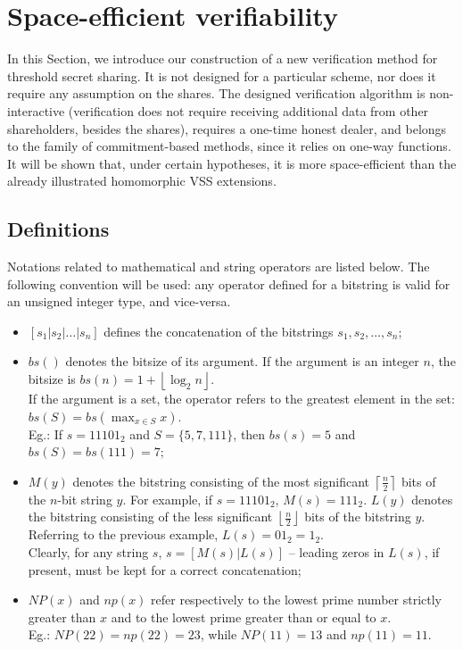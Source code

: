 \documentclass[10pt,journal,cspaper,compsoc]{IEEEtran}
\begin{document}
\section{Space-efficient verifiability}
\label{schemes-section}
In this Section, we introduce our construction of a new verification method for threshold secret sharing. It is not designed for a particular scheme, nor does it require any assumption on the shares.
The designed verification algorithm is non-interactive (verification does not require receiving additional data from other shareholders, besides the shares), requires a one-time honest  dealer, and belongs to the family of commitment-based methods, since it relies on one-way functions. It will be shown that, under certain hypotheses, it is more space-efficient than the already illustrated homomorphic VSS extensions.

\subsection{Definitions}
Notations related to mathematical and string operators are listed below. The following convention will be used: any operator defined for a bitstring is valid for an unsigned integer type, and vice-versa.

\begin{itemize}
\item{$[s_1|s_2|\ldots|s_n]$ defines the concatenation of the bitstrings $s_1,s_2,\ldots,s_n$};
\item{$bs()$ denotes the bitsize of its argument. If the argument is an integer $n$, the bitsize is
$ bs(n) = 1+ \left\lfloor {{{\log }_2}n} \right\rfloor $.\\
If the argument is a set, the operator refers to the greatest element in the set:
$ bs(S)=bs(\max_{x \in S} x)$.\\Eg.: If $s = 11101_2$ and $S = \{5,7,111\}$, then $bs(s)=5$ and $bs(S)=bs(111)=7$};
\item $M(y)$ denotes the bitstring consisting of the most significant 
$\left\lceil {\frac{n}{2}} \right\rceil$ bits of the $n$-bit string $y$.
For example, if ${s = 11101_2}$, ${M(s)= 111_2}$. $L(y)$ denotes the bitstring consisting of the less significant 
$\left\lfloor {\frac{n}{2}} \right\rfloor$ bits of the bitstring $y$. Referring to the previous example, ${L(s)=01_2=1_2}$.\\
Clearly, for any string $s$, $s = [M(s)|L(s)]$ -- leading zeros in $L(s)$, if present, must be kept for a correct concatenation;
\item $NP(x)$ and $np(x)$ refer respectively to the lowest prime number strictly greater than $x$ and to the lowest prime greater than or equal to $x$.\\Eg.: $NP(22)=np(22)=23$, while $NP(11)=13$ and $np(11)=11$.
\end{itemize}
\end{document}
